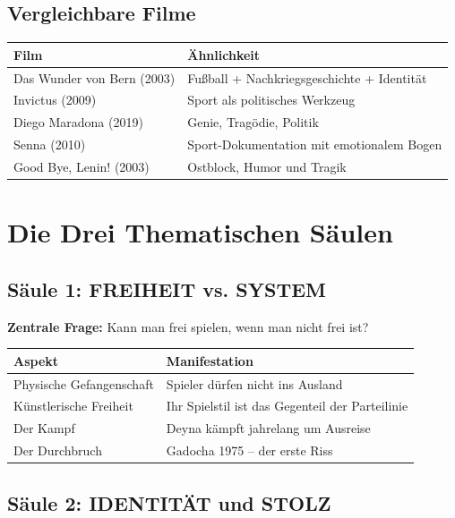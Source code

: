 \documentclass[11pt,a4paper]{book}
\begin{document}
\section{Vergleichbare Filme}

\begin{longtable}{L{4cm}L{9cm}}
\toprule
\textbf{Film} & \textbf{Ähnlichkeit} \\
\midrule
\endhead
Das Wunder von Bern (2003) & Fußball + Nachkriegsgeschichte + Identität \\
Invictus (2009) & Sport als politisches Werkzeug \\
Diego Maradona (2019) & Genie, Tragödie, Politik \\
Senna (2010) & Sport-Dokumentation mit emotionalem Bogen \\
Good Bye, Lenin! (2003) & Ostblock, Humor und Tragik \\
\bottomrule
\end{longtable}


\chapter{Die Drei Thematischen Säulen}

\section{Säule 1: FREIHEIT vs. SYSTEM}

\textbf{Zentrale Frage:} Kann man frei spielen, wenn man nicht frei ist?

\begin{longtable}{L{4cm}L{9cm}}
\toprule
\textbf{Aspekt} & \textbf{Manifestation} \\
\midrule
\endhead
Physische Gefangenschaft & Spieler dürfen nicht ins Ausland \\
Künstlerische Freiheit & Ihr Spielstil ist das Gegenteil der Parteilinie \\
Der Kampf & Deyna kämpft jahrelang um Ausreise \\
Der Durchbruch & Gadocha 1975 -- der erste Riss \\
\bottomrule
\end{longtable}

\section{Säule 2: IDENTITÄT und STOLZ}
\end{document}
